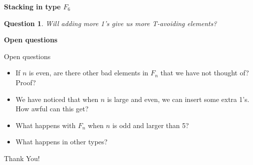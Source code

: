 \documentclass[9pt,handout]{beamer}
\newtheorem{question}{Question}
\newcommand{\<}{\langle}
\renewcommand{\>}{\rangle}
\begin{document}
\begin{frame}{\textbf{Stacking in type $F_{6}$}}
\begin{center}
\begin{tikzpicture}[scale=.29]
\end{tikzpicture}
\end{center}

\pause

\begin{question}
Will adding more 1's give us more T-avoiding elements?
\end{question}




\end{frame}




\begin{frame}{\textbf{Open questions}}

\begin{block}{Open questions}

\begin{itemize}

\pause

\item If $n$ is even, are there other bad elements in $F_{n}$ that we have not thought of?  Proof?

\pause

\item We have noticed that when $n$ is large and even, we can insert some extra 1's.  How awful can this get?

\pause

\item What happens with $F_n$ when $n$ is odd and larger than 5?  

\pause



\item What happens in other types?

\end{itemize}

\end{block}

\pause

\begin{center}
{\Huge Thank You!}
\end{center}


\end{frame}

\end{document}
